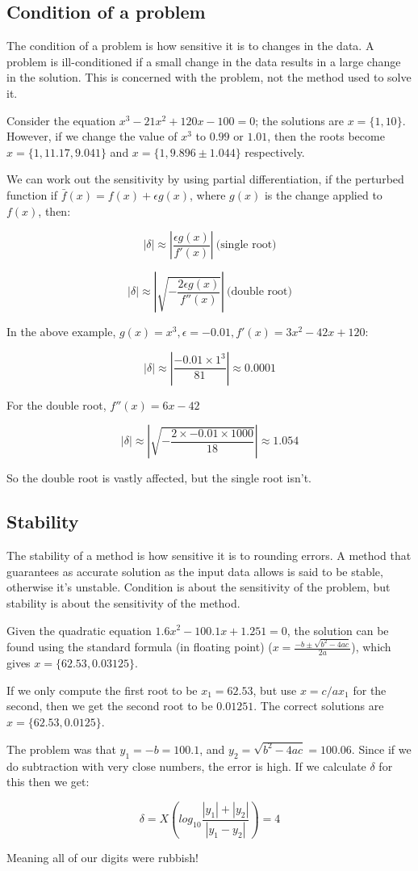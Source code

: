 \subsection{Condition of a problem}

The condition of a problem is how sensitive it is to changes in the data. A
problem is ill-conditioned if a small change in the data results in a large
change in the solution. This is concerned with the problem, not the method used
to solve it.

Consider the equation $x^3 - 21 x^2 + 120x - 100 = 0$; the solutions are $x =
\{1, 10\}$. However, if we change the value of $x^3$ to $0.99$ or $1.01$, then
the roots become $x = \{1, 11.17, 9.041\}$ and $x = \{1, 9.896 \pm 1.044\}$
respectively.

We can work out the sensitivity by using partial differentiation, if the
perturbed function if $\bar{f}(x) = f(x) + \epsilon g(x)$, where $g(x)$ is the
change applied to $f(x)$, then:

\[
  |\delta| \approx |\frac{\epsilon g(x)}{f'(x)}|~\text{(single root)}
\]

\[
  |\delta| \approx |\sqrt{-\frac{2\epsilon g(x)}{f''(x)}}|~\text{(double root)}
\]

In the above example, $g(x) = x^3, \epsilon = -0.01, f'(x) = 3x^2 - 42x + 120$:

\[
  |\delta| \approx |\frac{-0.01 \times 1^3}{81}| \approx 0.0001
\]

For the double root, $f''(x) = 6x - 42$

\[
  |\delta| \approx |\sqrt{-\frac{2 \times -0.01 \times 1000}{18}}| \approx 1.054
\]

So the double root is vastly affected, but the single root isn't.

\subsection{Stability}

The stability of a method is how sensitive it is to rounding errors. A method
that guarantees as accurate solution as the input data allows is said to be
stable, otherwise it's unstable. Condition is about the sensitivity of the
problem, but stability is about the sensitivity of the method.

Given the quadratic equation $1.6x^2 - 100.1x + 1.251 = 0$, the solution can be
found using the standard formula (in floating point) ($x = \frac{-b \pm\sqrt{b^2
- 4ac}}{2a}$), which gives $x = \{62.53, 0.03125\}$.

If we only compute the first root to be $x_1 = 62.53$, but use $x = c/ax_1$ for
the second, then we get the second root to be $0.01251$. The correct solutions
are $x = \{62.53, 0.0125\}$.

The problem was that $y_1 = -b = 100.1$, and  $y_2 = \sqrt{b^2 - 4ac} = 100.06$.
Since if we do subtraction with very close numbers, the error is high. If we
calculate $\delta$ for this then we get:

\[
  \delta = X(log_10\frac{|y_1| + |y_2|}{|y_1 - y_2|}) = 4
\]

Meaning all of our digits were rubbish!

